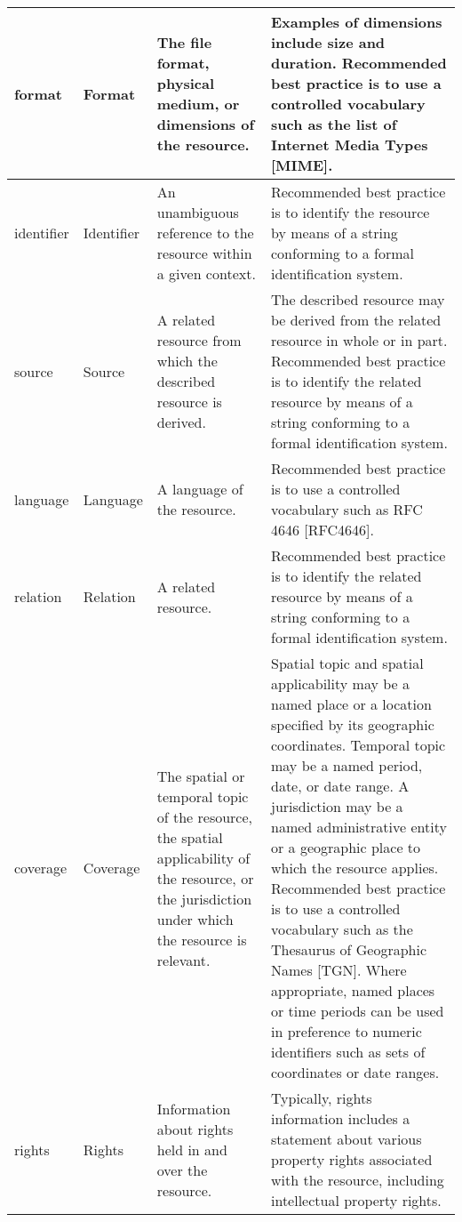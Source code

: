 \begin{flushleft}
\begin{longtable}{|p{2cm}|p{2cm}|p{4cm}|p{6cm}|}
        \hline format & Format & The file format, physical medium, or dimensions of the resource. & Examples of dimensions include size and duration. Recommended best practice is to use a controlled vocabulary such as the list of Internet Media Types [MIME].\\
        \hline identifier & Identifier & An unambiguous reference to the resource within a given context. & Recommended best practice is to identify the resource by means of a string conforming to a formal identification system.\\
        \hline source & Source & A related resource from which the described resource is derived. & The described resource may be derived from the related resource in whole or in part.  Recommended best practice is to identify the related resource by means of a string conforming to a formal identification system.\\
        \hline language & Language & A language of the resource. & Recommended best practice is to use a controlled vocabulary such as RFC 4646 [RFC4646].\\
        \hline relation & Relation & A related resource. & Recommended best practice is to identify the related resource by means of a string conforming to a formal identification system.\\
        \hline coverage & Coverage & The spatial or temporal topic of the resource, the spatial applicability of the resource, or the jurisdiction under which the resource is relevant. & Spatial topic and spatial applicability may be a named place or a location specified by its geographic coordinates.  Temporal topic may be a named period, date, or date range.  A jurisdiction may be a named administrative entity or a geographic place to which the resource applies.  Recommended best practice is to use a controlled vocabulary such as the Thesaurus of Geographic Names [TGN].  Where appropriate, named places or time periods can be used in preference to numeric identifiers such as sets of coordinates or date ranges.\\
        \hline rights & Rights & Information about rights held in and over the resource. & Typically, rights information includes a statement about various property rights associated with the resource, including intellectual property rights.\\
        \hline
    \end{longtable}

\end{flushleft}

